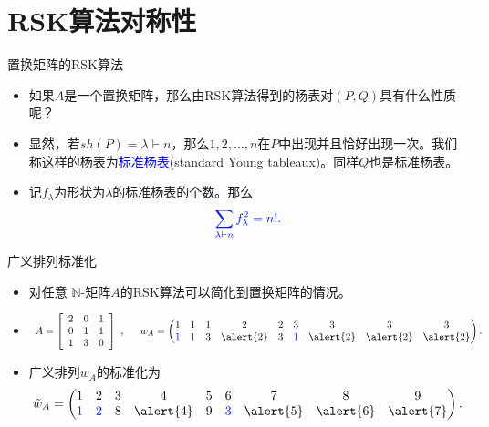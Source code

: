 \documentclass{beamer}
\newcommand{\blue}{\textcolor{blue}}
\begin{document}
\section{RSK算法对称性}

\begin{frame}{置换矩阵的RSK算法}
\begin{itemize}
\item 如果$A$是一个置换矩阵，那么由RSK算法得到的杨表对$(P,Q)$具有什么性质呢？

\pause \item 显然，若$sh(P)=\lambda \vdash n$，那么$1,2,\ldots,n$在$P$中出现并且恰好出现一次。我们称这样的杨表为\blue{标准杨表}(standard Young tableaux)。\pause 同样$Q$也是标准杨表。

\pause \item 记$f_{\lambda}$为形状为$\lambda$的标准杨表的个数。那么
$$\blue{\sum_{\lambda\vdash n}f_{\lambda}^2=n!.}$$
\end{itemize}
\end{frame}

\begin{frame}{广义排列标准化}
\begin{itemize}
\item 对任意
$\mathbb{N}$-矩阵$A$的RSK算法可以简化到置换矩阵的情况。

\pause \item
$$\begin{array}{c}
A = \left[
\begin{array}{ccc}
2 & 0 & 1\\
0 & 1 & 1\\
1 & 3 & 0
\end{array}
\right]
\end{array}, \quad
\begin{array}{c}
w_A=\begin{pmatrix}
1 & 1 & 1 & 2 & 2 & 3 & 3 & 3 & 3\\
\blue{1} & \blue{1} & 3 & \alert{2} & 3 & \blue{1} & \alert{2} & \alert{2} & \alert{2}
\end{pmatrix}.
\end{array}
$$
\pause \item 广义排列$w_A$的标准化为
$$\tilde{w}_A=\begin{pmatrix}
1 & 2 & 3 & 4 & 5 & 6 & 7 & 8 & 9\\
\blue{1} & \blue{2} & 8 & \alert{4} & 9 & \blue{3} & \alert{5} & \alert{6} & \alert{7}
\end{pmatrix}.
$$
\end{itemize}
\end{frame}
\end{document}
